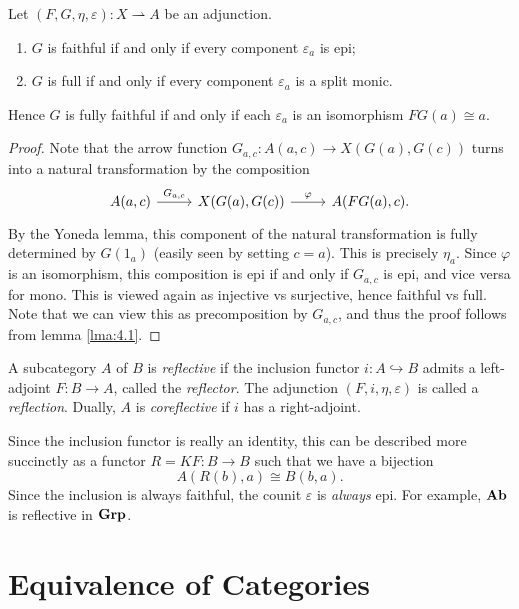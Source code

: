 \begin{theorem}\label{thm:4.3}
	Let $(F,G,\eta ,\varepsilon ) : X \rightharpoonup A$ be an adjunction.
	\begin{enumerate}
		\item $G$ is faithful if and only if every component $\varepsilon _a$ is epi;
		\item $G$ is full if and only if every component $\varepsilon _a$ is a split monic.
	\end{enumerate}
	Hence $G$ is fully faithful if and only if each $\varepsilon _a$ is an isomorphism $FG(a)\cong a$.
\end{theorem}
\begin{proof}
	Note that the arrow function $G_{a,c} : A(a,c) \to X(G(a),G(c))$ turns into a natural transformation by the composition
	\[\begin{tikzcd}[row sep = 2.5em, column sep = 2.5em]
	A(a,c)\ar[" G_{a\text{,} c}  ", r]  & X(G(a),G(c))\ar[" \varphi  ", r]  & A(FG(a),c).
	\end{tikzcd}\]
	By the Yoneda lemma, this component of the natural transformation is fully determined by $G(1_a)$ (easily seen by setting $c=a$). This is precisely $\eta _a$. Since $\varphi $ is an isomorphism, this composition is epi if and only if $G_{a,c} $ is epi, and vice versa for mono. This is viewed again as injective vs surjective, hence faithful vs full. Note that we can view this as precomposition by $G_{a,c} $, and thus the proof follows from lemma \ref{lma:4.1}.
\end{proof}

\begin{definition}\label{dfn:4.2}
	A subcategory $A$ of $B$ is \emph{reflective} if the inclusion functor $i : A \hookrightarrow B$ admits a left-adjoint $F : B \to A$, called the \emph{reflector}. The adjunction $(F,i,\eta ,\varepsilon )$ is called a \emph{reflection}. Dually, $A$ is \emph{coreflective} if $i$ has a right-adjoint.
\end{definition}

Since the inclusion functor is really an identity, this can be described more succinctly as a functor $R=KF : B \to B$ such that we have a bijection
\[
	A(R(b),a)\cong B(b,a)
.\]
Since the inclusion is always faithful, the counit $\varepsilon$ is \emph{always} epi. For example, $\mathbf{Ab}$ is reflective in $\mathbf{Grp} $.

\section{Equivalence of Categories}

